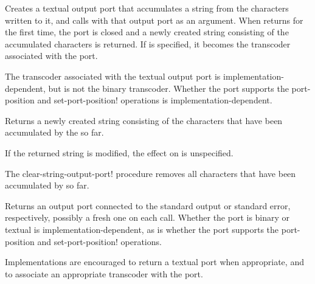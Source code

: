 \begin{entry}{%
}

Creates a textual output port that accumulates a string from the
characters written to it, and calls  with that output port
as an argument. When  returns for the first time, the port is
closed and a newly created string consisting of the accumulated
characters is returned.  If
 is specified, it becomes the transcoder associated
with the port.

The transcoder associated with the textual output port is
implementation-dependent, but is not the binary transcoder.
Whether the port supports
the {\cf port-position} and {\cf set-port-position!} operations
is implementation-dependent.
\end{entry}

\begin{entry}{%
}

Returns a newly created string consisting of the characters that
have been accumulated by the  so far.

If the returned string is modified, 
the effect on  is unspecified.
\end{entry}

\begin{entry}{%
}

The {\cf clear-string-output-port!} procedure removes all characters
that have been accumulated by  so far.
\end{entry}

\begin{entry}{%
}
   
Returns an output port connected to the standard output or standard error,
respectively, possibly a fresh one on each call.
Whether the port is binary or textual is implementation-dependent,
as is whether the port supports
the {\cf port-position} and {\cf set-port-position!} operations.

\begin{note}
  Implementations are encouraged to return a textual port when
  appropriate, and
  to associate an appropriate transcoder with the port.
\end{note}
\end{entry}

